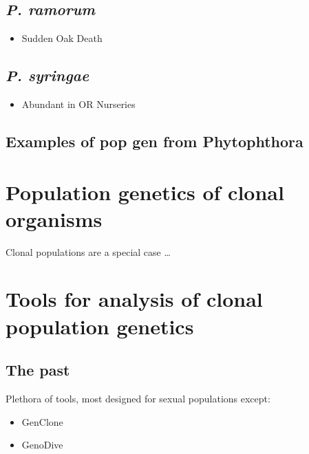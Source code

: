 \documentclass[double,12pt]{beavtex}
\providecommand{\tightlist}{%
  \setlength{\itemsep}{0pt}\setlength{\parskip}{0pt}}
\begin{document}
  \subsection{\texorpdfstring{\emph{P.
  ramorum}}{P. ramorum}}\label{p.-ramorum}
  
  \begin{itemize}
  \tightlist
  \item
    Sudden Oak Death
  \end{itemize}
  
  \subsection{\texorpdfstring{\emph{P.
  syringae}}{P. syringae}}\label{p.-syringae}
  
  \begin{itemize}
  \tightlist
  \item
    Abundant in OR Nurseries
  \end{itemize}
  
  \subsection{Examples of pop gen from
  Phytophthora}\label{examples-of-pop-gen-from-phytophthora}
  
  \section{Population genetics of clonal
  organisms}\label{population-genetics-of-clonal-organisms}
  
  Clonal populations are a special case \ldots{}
  
  \section{Tools for analysis of clonal population
  genetics}\label{tools-for-analysis-of-clonal-population-genetics}
  
  \subsection{The past}\label{the-past}
  
  Plethora of tools, most designed for sexual populations except:
  
  \begin{itemize}
  \tightlist
  \item
    GenClone
  \item
    GenoDive
  \end{itemize}
  
\end{document}
